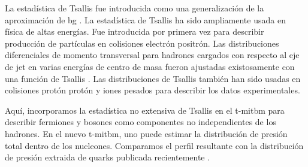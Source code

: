 La estadística de Tsallis fue introducida como una generalización de la aproximación de \acrshort{bg} \cite{Tsallis1988,Beck_2003,Tsallis2009,Tsallis_2014,Tsallis_2009}. La estadística de Tsallis ha sido ampliamente usada en física de altas energías. Fue introducida por primera vez para describir producción de partículas en colisiones electrón positrón. Las distribuciones diferenciales de momento transversal para hadrones cargados con respecto al eje de jet en varias energías de centro de masa fueron ajustadas existosamente con una función de Tsallis \cite{Bediaga_2000,Collaboration1984}. Las distribuciones de Tsallis también han sido usadas en colisiones protón protón\cite{PhysRevLett.105.022002,Marques_2015,Bhattacharyya_2018,Khuntia_2017} y iones pesados \cite{Saraswat_2018,Saraswat_2017}
 para describir los datos experimentales.


Aquí, incorporamos la estadística no extensiva de Tsallis en el \acrshort{t-mitbm} para describir fermiones y bosones como componentes no independientes de los hadrones. En el nuevo \acrshort{t-mitbm}, uno puede estimar la distribución de presión total dentro de los nucleones. Comparamos el perfil resultante con la distribución de presión extraida de quarks publicada recientemente \cite{Burkert_2018}.


